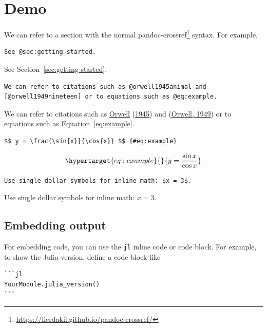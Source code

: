 \documentclass[
  notoc %
]{tufte-book}
\DeclareRobustCommand{\href}[2]{#2\footnote{\url{#1}}}
\newcommand{\passthrough}[1]{#1}
\begin{document}
\hypertarget{sec:demo}{%
\chapter{Demo}\label{sec:demo}}

We can refer to a section with the normal
\href{https://lierdakil.github.io/pandoc-crossref/}{pandoc-crossref}
syntax. For example,

\begin{lstlisting}
See @sec:getting-started.
\end{lstlisting}

See Section~\ref{sec:getting-started}.

\begin{lstlisting}
We can refer to citations such as @orwell1945animal and
[@orwell1949nineteen] or to equations such as @eq:example.
\end{lstlisting}

We can refer to citations such as
\protect\hyperlink{ref-orwell1945animal}{Orwell}
(\protect\hyperlink{ref-orwell1945animal}{1945}) and
(\protect\hyperlink{ref-orwell1949nineteen}{Orwell, 1949}) or to
equations such as Equation~\ref{eq:example}.

\begin{lstlisting}
$$ y = \frac{\sin{x}}{\cos{x}} $$ {#eq:example}
\end{lstlisting}

\begin{equation}\protect\hypertarget{eq:example}{}{ y = \frac{\sin{x}}{\cos{x}} }\label{eq:example}\end{equation}

\begin{lstlisting}
Use single dollar symbols for inline math: $x = 3$.
\end{lstlisting}

Use single dollar symbols for inline math: \(x = 3\).

\hypertarget{sec:embedding-output}{%
\section{Embedding output}\label{sec:embedding-output}}

For embedding code, you can use the \passthrough{\lstinline!jl!} inline
code or code block. For example, to show the Julia version, define a
code block like

\begin{lstlisting}
```jl
YourModule.julia_version()
```
\end{lstlisting}
\end{document}
